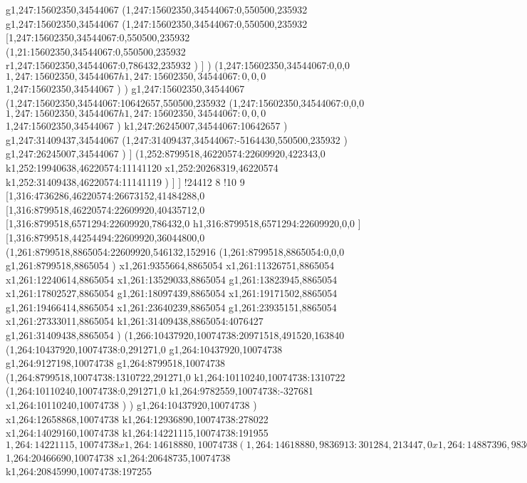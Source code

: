 {g1,247:15602350,34544067
(1,247:15602350,34544067:0,550500,235932
g1,247:15602350,34544067
(1,247:15602350,34544067:0,550500,235932
[1,247:15602350,34544067:0,550500,235932
(1,21:15602350,34544067:0,550500,235932
r1,247:15602350,34544067:0,786432,235932
)
]
)
(1,247:15602350,34544067:0,0,0
$1,247:15602350,34544067
h1,247:15602350,34544067:0,0,0
$1,247:15602350,34544067
)
)
g1,247:15602350,34544067
(1,247:15602350,34544067:10642657,550500,235932
(1,247:15602350,34544067:0,0,0
$1,247:15602350,34544067
h1,247:15602350,34544067:0,0,0
$1,247:15602350,34544067
)
k1,247:26245007,34544067:10642657
)
g1,247:31409437,34544067
(1,247:31409437,34544067:-5164430,550500,235932
)
g1,247:26245007,34544067
)
]
(1,252:8799518,46220574:22609920,422343,0
k1,252:19940638,46220574:11141120
x1,252:20268319,46220574
k1,252:31409438,46220574:11141119
)
]
]
!24412
}8
!10
{9
[1,316:4736286,46220574:26673152,41484288,0
[1,316:8799518,46220574:22609920,40435712,0
[1,316:8799518,6571294:22609920,786432,0
h1,316:8799518,6571294:22609920,0,0
]
[1,316:8799518,44254494:22609920,36044800,0
(1,261:8799518,8865054:22609920,546132,152916
(1,261:8799518,8865054:0,0,0
g1,261:8799518,8865054
)
x1,261:9355664,8865054
x1,261:11326751,8865054
x1,261:12240614,8865054
x1,261:13529033,8865054
g1,261:13823945,8865054
x1,261:17802527,8865054
g1,261:18097439,8865054
x1,261:19171502,8865054
g1,261:19466414,8865054
x1,261:23640239,8865054
g1,261:23935151,8865054
x1,261:27333011,8865054
k1,261:31409438,8865054:4076427
g1,261:31409438,8865054
)
(1,266:10437920,10074738:20971518,491520,163840
(1,264:10437920,10074738:0,291271,0
g1,264:10437920,10074738
g1,264:9127198,10074738
g1,264:8799518,10074738
(1,264:8799518,10074738:1310722,291271,0
k1,264:10110240,10074738:1310722
(1,264:10110240,10074738:0,291271,0
k1,264:9782559,10074738:-327681
x1,264:10110240,10074738
)
)
g1,264:10437920,10074738
)
x1,264:12658868,10074738
k1,264:12936890,10074738:278022
x1,264:14029160,10074738
k1,264:14221115,10074738:191955
$1,264:14221115,10074738
x1,264:14618880,10074738
(1,264:14618880,9836913:301284,213447,0
x1,264:14887396,9836913
)
k1,264:15102204,10074738:182040
x1,264:15611930,10074738
k1,264:15793970,10074738:182040
(1,264:15793970,10074738:921146,282168,127431
x1,264:16706015,10074738
)
k1,264:16824340,10074738:109224
(1,264:16824340,10074738:1092270,437688,0
x1,264:17916610,10074738
)
(1,264:17916610,10173041:1141967,313481,34716
x1,264:18958635,10173041
)
k1,264:19167801,10074738:109224
x1,264:19488656,10074738
x1,264:20466690,10074738
$1,264:20466690,10074738
x1,264:20648735,10074738
k1,264:20845990,10074738:197255
}
